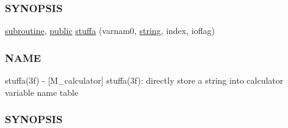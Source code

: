 \begin{DoxyCompactItemize}
\begin{DoxyCompactList}
\subsubsection*{S\+Y\+N\+O\+P\+S\+IS}\end{DoxyCompactList}\item 
\hyperlink{M__stopwatch_83_8txt_acfbcff50169d691ff02d4a123ed70482}{subroutine}, \hyperlink{M__stopwatch_83_8txt_a2f74811300c361e53b430611a7d1769f}{public} \hyperlink{namespacem__calculator_ade5ed0d5db38a14b2c521bc268756f39}{stuffa} (varnam0, \hyperlink{what__overview_81_8txt_a74cb7e955273b9f9157b4f0c18a38849}{string}, index, ioflag)
\begin{DoxyCompactList}\small\item\em \subsubsection*{N\+A\+ME}

stuffa(3f) -\/ \mbox{[}M\+\_\+calculator\mbox{]} stuffa(3f)\+: directly store a string into calculator variable name table \subsubsection*{S\+Y\+N\+O\+P\+S\+IS}\end{DoxyCompactList}\end{DoxyCompactItemize}
